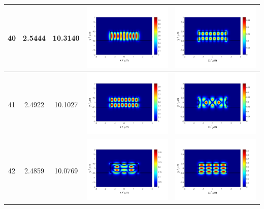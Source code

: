\documentclass{assignment}
\begin{document}
\begin{sol}
\begin{itemize}
\begin{longtable}[c]{|c|c|c|c|c|}
            40 & 2.5444 & 10.3140 & \includegraphics[width=.3\columnwidth]{Assignment-2-mode-40-Ex.png} & \includegraphics[width=.3\columnwidth]{Assignment-2-mode-40-Ey.png} \\ \hline
            41 & 2.4922 & 10.1027 & \includegraphics[width=.3\columnwidth]{Assignment-2-mode-41-Ex.png} & \includegraphics[width=.3\columnwidth]{Assignment-2-mode-41-Ey.png} \\ \hline
            42 & 2.4859 & 10.0769 & \includegraphics[width=.3\columnwidth]{Assignment-2-mode-42-Ex.png} & \includegraphics[width=.3\columnwidth]{Assignment-2-mode-42-Ey.png} \\ \hline

\end{longtable}
\end{itemize}
\end{sol}
\end{document}
